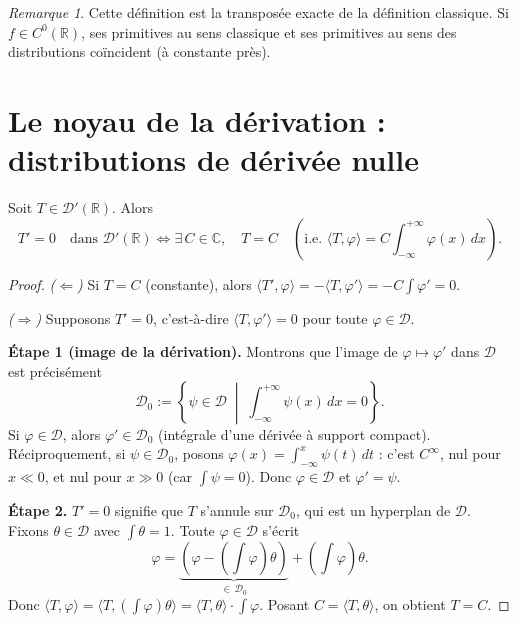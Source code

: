 \documentclass[12pt,a4paper,openany]{book}
\theoremstyle{definition}
\theoremstyle{plain}
\theoremstyle{remark}
\newtheorem*{remark}{Remarque}
\newenvironment{remarque}{\begin{remark}}{\end{remark}}
\begin{document}
	\begin{remarque}
		Cette définition est la transposée exacte de la définition classique. Si $f \in C^0(\mathbb{R})$, ses primitives au sens classique et ses primitives au sens des distributions coïncident (à constante près).
	\end{remarque}
	
	\section{Le noyau de la dérivation : distributions de dérivée nulle}
	
	\begin{lemma}
		Soit $T \in \mathcal{D}'(\mathbb{R})$. Alors
		\[
		T' = 0 \quad \text{dans } \mathcal{D}'(\mathbb{R})
		\iff
		\exists\, C \in \mathbb{C}, \quad T = C
		\quad\left(\text{i.e. } \langle T, \varphi\rangle = C\int_{-\infty}^{+\infty}\varphi(x)\,dx\right).
		\]
	\end{lemma}
	
	\begin{proof}
		\emph{($\Leftarrow$)} Si $T = C$ (constante), alors $\langle T', \varphi\rangle = -\langle T, \varphi'\rangle = -C\int\varphi' = 0$.
		
		\emph{($\Rightarrow$)} Supposons $T' = 0$, c'est-à-dire $\langle T, \varphi'\rangle = 0$ pour toute $\varphi \in \mathcal{D}$.
		
		\textbf{Étape 1 (image de la dérivation).} Montrons que l'image de $\varphi \mapsto \varphi'$ dans $\mathcal{D}$ est précisément
		\[
		\mathcal{D}_0 := \left\{\psi \in \mathcal{D}\;\middle|\; \int_{-\infty}^{+\infty}\psi(x)\,dx = 0\right\}.
		\]
		Si $\varphi \in \mathcal{D}$, alors $\varphi' \in \mathcal{D}_0$ (intégrale d'une dérivée à support compact). Réciproquement, si $\psi \in \mathcal{D}_0$, posons $\varphi(x) = \int_{-\infty}^x\psi(t)\,dt$ : c'est $C^\infty$, nul pour $x \ll 0$, et nul pour $x \gg 0$ (car $\int\psi = 0$). Donc $\varphi \in \mathcal{D}$ et $\varphi' = \psi$.
		
		\textbf{Étape 2.} $T' = 0$ signifie que $T$ s'annule sur $\mathcal{D}_0$, qui est un hyperplan de $\mathcal{D}$.
		Fixons $\theta \in \mathcal{D}$ avec $\int\theta = 1$. Toute $\varphi \in \mathcal{D}$ s'écrit
		\[
		\varphi = \underbrace{\left(\varphi - \left(\int\varphi\right)\theta\right)}_{\in\,\mathcal{D}_0} + \left(\int\varphi\right)\theta.
		\]
		Donc $\langle T, \varphi\rangle = \langle T, (\int\varphi)\theta\rangle = \langle T, \theta\rangle \cdot \int\varphi$. Posant $C = \langle T, \theta\rangle$, on obtient $T = C$.
	\end{proof}
	
\end{document}
